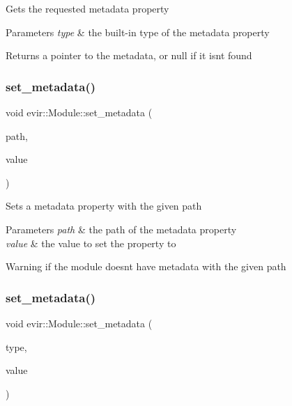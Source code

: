 Gets the requested metadata property 
\begin{DoxyParams}{Parameters}
{\em type} & the built-\/in type of the metadata property \\
\hline
\end{DoxyParams}
\begin{DoxyReturn}{Returns}
a pointer to the metadata, or null if it isn\textquotesingle{}t found 
\end{DoxyReturn}
\mbox{\label{classevir_1_1Module_ab245cceb132496f9c9ce5701158b5bab}} 
\subsubsection{\texorpdfstring{set\+\_\+metadata()}{set\_metadata()}\hspace{0.1cm}{\footnotesize\ttfamily [1/2]}}
{\footnotesize\ttfamily void evir\+::\+Module\+::set\+\_\+metadata (\begin{DoxyParamCaption}\item[{\hyperlink{classevir_1_1Metadata_a0a3a8f0c937238fae5262283bac6286a}{Metadata\+::path}}]{path,  }\item[{\hyperlink{classevir_1_1Value}{Value} $\ast$}]{value }\end{DoxyParamCaption})}

Sets a metadata property with the given path 
\begin{DoxyParams}{Parameters}
{\em path} & the path of the metadata property \\
\hline
{\em value} & the value to set the property to \\
\hline
\end{DoxyParams}
\begin{DoxyWarning}{Warning}
if the module doesn\textquotesingle{}t have metadata with the given path 
\end{DoxyWarning}
\mbox{\label{classevir_1_1Module_a0522ae8c24fce527c2de575fc0550773}} 
\subsubsection{\texorpdfstring{set\+\_\+metadata()}{set\_metadata()}\hspace{0.1cm}{\footnotesize\ttfamily [2/2]}}
{\footnotesize\ttfamily void evir\+::\+Module\+::set\+\_\+metadata (\begin{DoxyParamCaption}\item[{\hyperlink{classevir_1_1Metadata_a292423b7a2d93f70382d1da4929f55a0}{Metadata\+::builtin\+\_\+property\+\_\+type}}]{type,  }\item[{\hyperlink{classevir_1_1Value}{Value} $\ast$}]{value }\end{DoxyParamCaption})}

